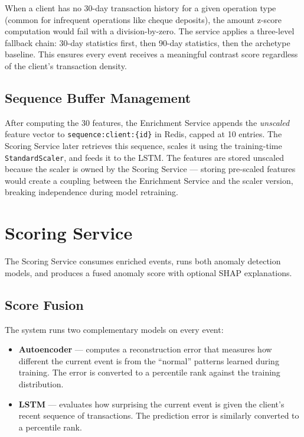 When a client has no 30-day transaction history for a given operation type
(common for infrequent operations like cheque deposits), the amount z-score
computation would fail with a division-by-zero. The service applies a three-level
fallback chain: 30-day statistics first, then 90-day statistics, then the
archetype baseline. This ensures every event receives a meaningful contrast
score regardless of the client's transaction density.

\subsection{Sequence Buffer Management}

After computing the 30 features, the Enrichment Service appends the
\emph{unscaled} feature vector to \texttt{sequence:client:\{id\}} in Redis,
capped at 10 entries. The Scoring Service later retrieves this sequence,
scales it using the training-time \texttt{StandardScaler}, and feeds it to
the LSTM. The features are stored unscaled because the scaler is owned by
the Scoring Service --- storing pre-scaled features would create a coupling
between the Enrichment Service and the scaler version, breaking independence
during model retraining.

\section{Scoring Service}

The Scoring Service consumes enriched events, runs both anomaly detection
models, and produces a fused anomaly score with optional SHAP explanations.

\subsection{Score Fusion}

The system runs two complementary models on every event:

\begin{itemize}
    \item \textbf{Autoencoder} --- computes a reconstruction error that
          measures how different the current event is from the ``normal''
          patterns learned during training. The error is converted to a
          percentile rank against the training distribution.
    \item \textbf{LSTM} --- evaluates how surprising the current event is
          given the client's recent sequence of transactions. The prediction
          error is similarly converted to a percentile rank.
\end{itemize}


